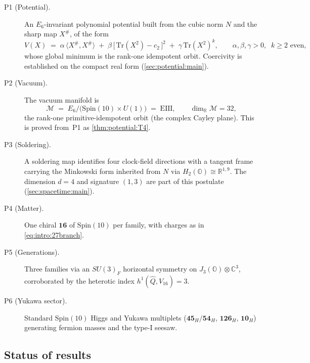 \documentclass[11pt]{article}
\theoremstyle{plain}
\theoremstyle{definition}
\theoremstyle{remark}
\begin{document}
\begin{description}
  \item[\textnormal{P1} (Potential).] An $E_6$-invariant polynomial potential
    built from the cubic norm $N$ and the sharp map $X^{\#}$, of the form
    \begin{equation}
      V(X)\;=\;\alpha\,\langle X^{\#},X^{\#}\rangle
        \;+\;\beta\,\bigl[\,\mathrm{Tr}(X^{2})-c_2\,\bigr]^{2}
        \;+\;\gamma\,\mathrm{Tr}(X^{2})^{k},
      \qquad \alpha,\beta,\gamma>0,\;\; k\ge 2 \text{ even},
      \label{eq:intro:V}
    \end{equation}
    whose global minimum is the rank-one idempotent orbit. Coercivity is
    established on the compact real form (\autoref{sec:potential:main}).
  \item[\textnormal{P2} (Vacuum).] The vacuum manifold is
    \begin{equation}
      \mathcal{M}\;=\;E_6/\bigl(\mathrm{Spin}(10)\times U(1)\bigr)\;=\;\mathrm{EIII},
      \qquad \dim_{\mathbb{R}}\mathcal{M}=32,
      \label{eq:intro:vacuum}
    \end{equation}
    the rank-one primitive-idempotent orbit (the complex Cayley plane). This is
    proved from~\textnormal{P1} as \autoref{thm:potential:T4}.
  \item[\textnormal{P3} (Soldering).] A soldering map identifies four
    clock-field directions with a tangent frame carrying the Minkowski form
    inherited from $N$ via $H_2(\mathbb{O})\cong\mathbb{R}^{1,9}$. The
    dimension $d=4$ and signature $(1,3)$ are part of this postulate
    (\autoref{sec:spacetime:main}).
  \item[\textnormal{P4} (Matter).] One chiral $\mathbf{16}$ of
    $\mathrm{Spin}(10)$ per family, with charges as in
    \eqref{eq:intro:27branch}.
  \item[\textnormal{P5} (Generations).] Three families via an $SU(3)_F$
    horizontal symmetry on $J_3(\mathbb{O})\otimes\mathbb{C}^{3}$, corroborated
    by the heterotic index $h^{1}(\hat Q,V_{16})=3$.
  \item[\textnormal{P6} (Yukawa sector).] Standard $\mathrm{Spin}(10)$ Higgs and
    Yukawa multiplets ($\mathbf{45}_H/\mathbf{54}_H$, $\mathbf{126}_H$,
    $\mathbf{10}_H$) generating fermion masses and the type-I seesaw.
\end{description}

\subsection{Status of results}
\label{sec:intro:convention}
\end{document}
